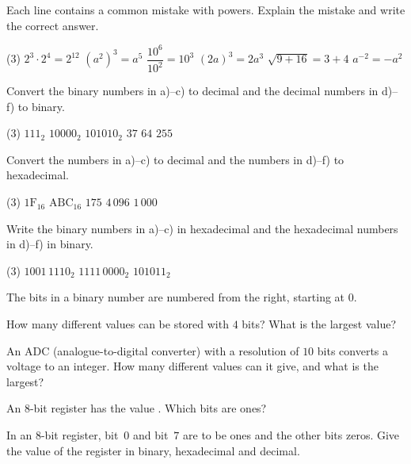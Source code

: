 Each line contains a common mistake with powers. Explain the mistake and write the correct answer.
\begin{delar}(3)
  \task $2^3 \cdot 2^4 = 2^{12}$
  \task $\left(a^2\right)^3 = a^5$
  \task $\dfrac{10^6}{10^2} = 10^3$
  \task $(2a)^3 = 2a^3$
  \task $\sqrt{9 + 16} = 3 + 4$
  \task $a^{-2} = -a^2$
\end{delar}

Convert the binary numbers in a)--c) to decimal and the decimal numbers in d)--f) to binary.
\begin{delar}(3)
  \task $111_2$
  \task $10000_2$
  \task $101010_2$
  \task $37$
  \task $64$
  \task $255$
\end{delar}

Convert the numbers in a)--c) to decimal and the numbers in d)--f) to hexadecimal.
\begin{delar}(3)
  \task $\mathrm{1F}_{16}$
  \task {}
  \task $\mathrm{ABC}_{16}$
  \task $175$
  \task $4\,096$
  \task $1\,000$
\end{delar}

Write the binary numbers in a)--c) in hexadecimal and the hexadecimal numbers in d)--f) in binary.
\begin{delar}(3)
  \task $1001\,1110_2$
  \task $1111\,0000_2$
  \task $101011_2$
  \task {}
  \task {}
  \task {}
\end{delar}

The bits in a binary number are numbered from the right, starting at $0$.
\begin{parts}
  \item How many different values can be stored with $4$ bits? What is the largest value?
  \item An ADC (analogue-to-digital converter) with a resolution of $10$ bits converts a voltage to
    an integer. How many different values can it give, and what is the largest?
  \item An 8-bit register has the value . Which bits are ones?
  \item In an 8-bit register, bit~$0$ and bit~$7$ are to be ones and the other bits zeros. Give the
    value of the register in binary, hexadecimal and decimal.
\end{parts}
